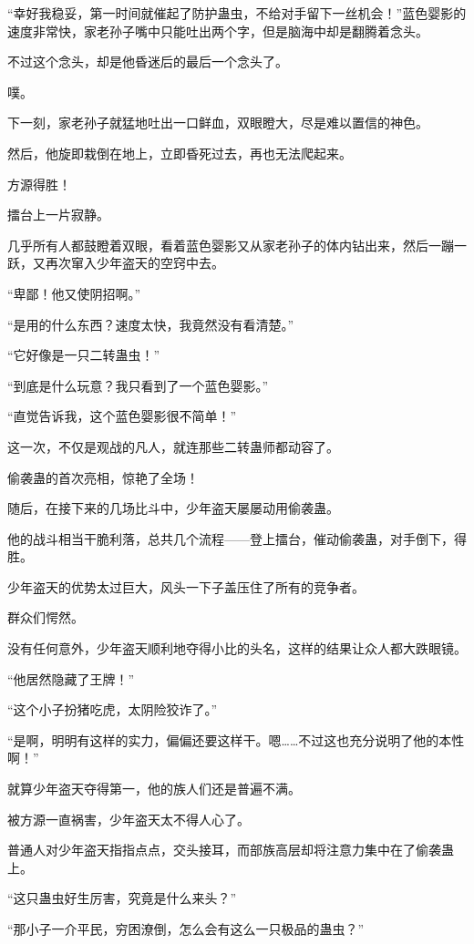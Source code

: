 \begin{this_body}
“幸好我稳妥，第一时间就催起了防护蛊虫，不给对手留下一丝机会！”蓝色婴影的速度非常快，家老孙子嘴中只能吐出两个字，但是脑海中却是翻腾着念头。

不过这个念头，却是他昏迷后的最后一个念头了。

噗。

下一刻，家老孙子就猛地吐出一口鲜血，双眼瞪大，尽是难以置信的神色。

然后，他旋即栽倒在地上，立即昏死过去，再也无法爬起来。

方源得胜！

擂台上一片寂静。

几乎所有人都鼓瞪着双眼，看着蓝色婴影又从家老孙子的体内钻出来，然后一蹦一跃，又再次窜入少年盗天的空窍中去。

“卑鄙！他又使阴招啊。”

“是用的什么东西？速度太快，我竟然没有看清楚。”

“它好像是一只二转蛊虫！”

“到底是什么玩意？我只看到了一个蓝色婴影。”

“直觉告诉我，这个蓝色婴影很不简单！”

这一次，不仅是观战的凡人，就连那些二转蛊师都动容了。

偷袭蛊的首次亮相，惊艳了全场！

随后，在接下来的几场比斗中，少年盗天屡屡动用偷袭蛊。

他的战斗相当干脆利落，总共几个流程——登上擂台，催动偷袭蛊，对手倒下，得胜。

少年盗天的优势太过巨大，风头一下子盖压住了所有的竞争者。

群众们愕然。

没有任何意外，少年盗天顺利地夺得小比的头名，这样的结果让众人都大跌眼镜。

“他居然隐藏了王牌！”

“这个小子扮猪吃虎，太阴险狡诈了。”

“是啊，明明有这样的实力，偏偏还要这样干。嗯……不过这也充分说明了他的本性啊！”

就算少年盗天夺得第一，他的族人们还是普遍不满。

被方源一直祸害，少年盗天太不得人心了。

普通人对少年盗天指指点点，交头接耳，而部族高层却将注意力集中在了偷袭蛊上。

“这只蛊虫好生厉害，究竟是什么来头？”

“那小子一介平民，穷困潦倒，怎么会有这么一只极品的蛊虫？”


\end{this_body}
